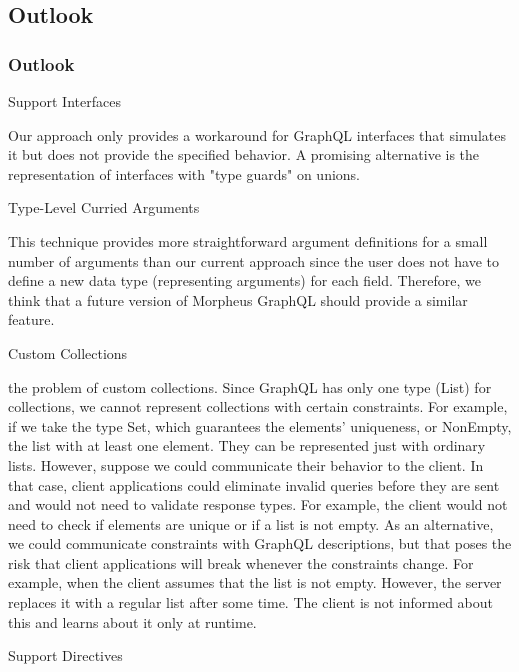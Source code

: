 \subsection{Outlook}
\begin{frame}\frametitle{Outlook}

\begin{block}{Support Interfaces}

Our approach only provides a workaround for GraphQL interfaces that simulates it but does not provide the specified behavior. A promising alternative is the representation of interfaces with "type guards" on unions. 

\end{block}

\begin{block}{Type-Level Curried Arguments}

This technique provides more straightforward argument definitions for a small number of arguments than our current approach since the user does not have to define a new data type (representing arguments) for each field. Therefore, we think that a future version of Morpheus GraphQL should provide a similar feature. 

\end{block}

\begin{block}{Custom Collections}

the problem of custom collections. Since GraphQL has only one type (List) for collections, we cannot represent collections with certain constraints. For example, if we take the type Set, which guarantees the elements' uniqueness, or NonEmpty, the list with at least one element. They can be represented just with ordinary lists.  However, suppose we could communicate their behavior to the client. In that case, client applications could eliminate invalid queries before they are sent and would not need to validate response types. For example, the client would not need to check if elements are unique or if a list is not empty.  As an alternative, we could communicate constraints with GraphQL descriptions, but that poses the risk that client applications will break whenever the constraints change. For example, when the client assumes that the list is not empty. However, the server replaces it with a regular list after some time. The client is not informed about this and learns about it only at runtime.

\end{block}

\begin{block}{Support Directives} 


\end{block}
\end{frame}
